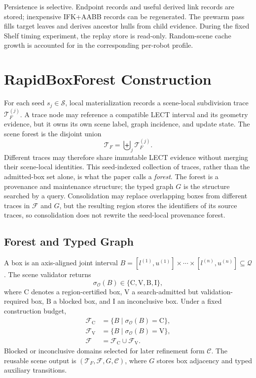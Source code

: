 \documentclass[journal]{IEEEtran}
\newcommand{\calO}{\ensuremath{\mathcal{O}}}
\newcommand{\Q}{\ensuremath{\mathcal{Q}}}
\newcommand{\StatusC}{\ensuremath{\mathrm{C}}}
\newcommand{\StatusV}{\ensuremath{\mathrm{V}}}
\newcommand{\StatusB}{\ensuremath{\mathrm{B}}}
\newcommand{\StatusI}{\ensuremath{\mathrm{I}}}
\begin{document}
Persistence is selective. Endpoint records and useful derived link records are
stored; inexpensive IFK+AABB records can be regenerated. The prewarm pass fills
target leaves and derives ancestor hulls from child evidence. During the fixed
Shelf timing experiment, the replay store is read-only. Random-scene cache
growth is accounted for in the corresponding per-robot profile.

\section{RapidBoxForest Construction}\label{sec:forest}

For each seed $s_j\in\mathcal{S}$, local materialization records a scene-local
subdivision trace $\mathcal{T}_F^{(j)}$. A trace node may reference a compatible
LECT interval and its geometry evidence, but it owns its own scene label, graph
incidence, and update state. The scene forest is the disjoint union
\[
\mathcal{T}_F=\biguplus_j\mathcal{T}_F^{(j)}.
\]
Different traces may therefore share immutable LECT evidence without merging
their scene-local identities. This seed-indexed collection of traces, rather
than the admitted-box set alone, is what the paper calls a \emph{forest}. The
forest is a provenance and maintenance structure; the typed graph $G$ is the
structure searched by a query. Consolidation may replace overlapping boxes from
different traces in $\mathcal{F}$ and $G$, but the resulting region stores the
identifiers of its source traces, so consolidation does not rewrite the
seed-local provenance forest.

\subsection{Forest and Typed Graph}\label{sec:forest_objective}

A box is an axis-aligned joint interval
$B=[l^{(1)},u^{(1)}]\times\cdots\times[l^{(n)},u^{(n)}]\subseteq\Q$.
The scene validator returns
\[
\sigma_{\calO}(B)\in
\{\StatusC,\StatusV,\StatusB,\StatusI\},
\]
where $\StatusC$ denotes a region-certified box, $\StatusV$ a search-admitted
but validation-required box, $\StatusB$ a blocked box, and $\StatusI$ an
inconclusive box. Under a fixed construction budget,
\[
\begin{aligned}
\mathcal{F}_{\mathrm C}&=\{B\mid\sigma_{\calO}(B)=\StatusC\},\\
\mathcal{F}_{\mathrm V}&=\{B\mid\sigma_{\calO}(B)=\StatusV\},\\
\mathcal{F}&=\mathcal{F}_{\mathrm C}\cup\mathcal{F}_{\mathrm V}.
\end{aligned}
\]
Blocked or inconclusive domains selected for later refinement form
$\mathcal{C}$. The reusable scene output is
$(\mathcal{T}_F,\mathcal{F},G,\mathcal{C})$, where $G$ stores box adjacency and
typed auxiliary transitions.
\end{document}
